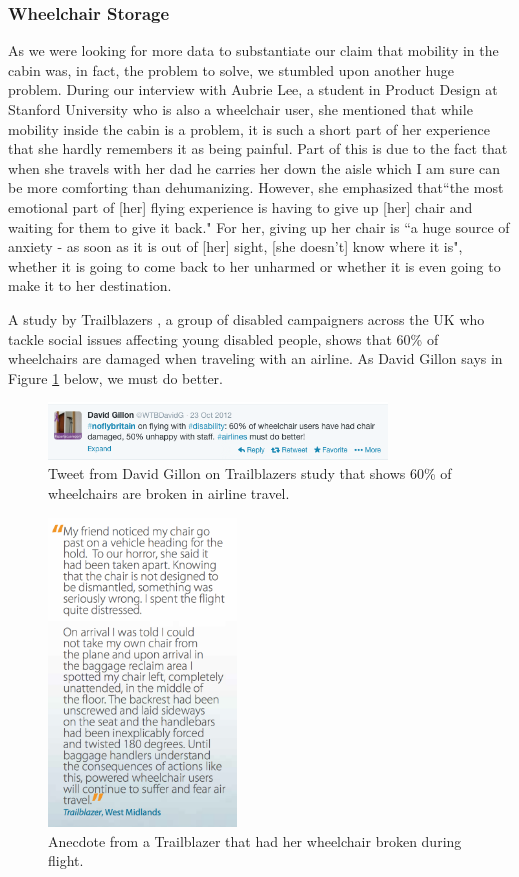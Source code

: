\subsubsection*{Wheelchair Storage}

As we were looking for more data to substantiate our claim that mobility in the cabin was, in fact, the problem to solve, we stumbled upon another huge problem. During our interview with Aubrie Lee, a student in Product Design at Stanford University who is also a wheelchair user, she mentioned that while mobility inside the cabin is a problem, it is such a short part of her experience that she hardly remembers it as being painful. Part of this is due to the fact that when she travels with her dad he carries her down the aisle which I am sure can be more comforting than dehumanizing. However, she emphasized that``the most emotional part of [her] flying experience is having to give up [her] chair and waiting for them to give it back." For her, giving up her chair is ``a huge source of anxiety - as soon as it is out of [her] sight, [she doesn't] know where it is", whether it is going to come back to her unharmed or whether it is even going to make it to her destination. 

A study by Trailblazers \cite{trailblazers}, a group of disabled campaigners across the UK who tackle social issues affecting young disabled people, shows that 60\% of wheelchairs are damaged when traveling with an airline. As David Gillon says in Figure \ref{fig:60percenttweet.png} below, we must do better. 


\begin{figure}[h]
  \centering
     \includegraphics[width=9cm]{images/60percenttweet.png}
   \caption{Tweet from David Gillon on Trailblazers study that shows 60\% of wheelchairs are broken in airline travel. }
  \label{fig:60percenttweet.png}
\end{figure}

\begin{figure}[h]
  \centering
     \includegraphics[width=5cm]{images/wheelchairstory.png}
   \caption{Anecdote from a Trailblazer that had her wheelchair broken during flight. \cite{trailblazers}}
  \label{fig:wheelchairstory.png}
\end{figure}

